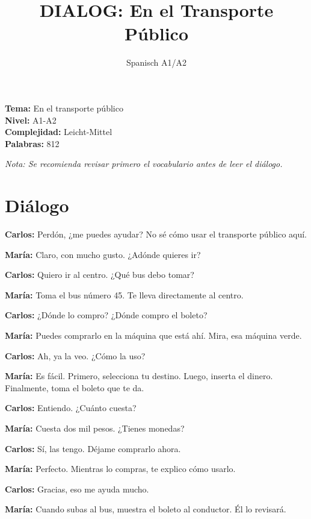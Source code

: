 \documentclass[12pt,a4paper]{article}
\begin{document}
\title{\textbf{DIALOG: En el Transporte Público}}
\author{Spanisch A1/A2}
\date{}
\maketitle

\textbf{Tema:} En el transporte público \\
\textbf{Nivel:} A1-A2 \\
\textbf{Complejidad:} Leicht-Mittel \\
\textbf{Palabras:} 812

\vspace{1em}

\textit{Nota: Se recomienda revisar primero el vocabulario antes de leer el diálogo.}

\vspace{1em}

\section*{Diálogo}

\textbf{Carlos:} Perdón, ¿me puedes ayudar? No sé cómo usar el transporte público aquí.

\textbf{María:} Claro, con mucho gusto. ¿Adónde quieres ir?

\textbf{Carlos:} Quiero ir al centro. ¿Qué bus debo tomar?

\textbf{María:} Toma el bus número 45. Te lleva directamente al centro.

\textbf{Carlos:} ¿Dónde lo compro? ¿Dónde compro el boleto?

\textbf{María:} Puedes comprarlo en la máquina que está ahí. Mira, esa máquina verde.

\textbf{Carlos:} Ah, ya la veo. ¿Cómo la uso?

\textbf{María:} Es fácil. Primero, selecciona tu destino. Luego, inserta el dinero. Finalmente, toma el boleto que te da.

\textbf{Carlos:} Entiendo. ¿Cuánto cuesta?

\textbf{María:} Cuesta dos mil pesos. ¿Tienes monedas?

\textbf{Carlos:} Sí, las tengo. Déjame comprarlo ahora.

\textbf{María:} Perfecto. Mientras lo compras, te explico cómo usarlo.

\textbf{Carlos:} Gracias, eso me ayuda mucho.

\textbf{María:} Cuando subas al bus, muestra el boleto al conductor. Él lo revisará.
\end{document}
